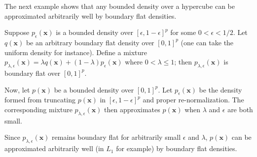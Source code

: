 The next example shows that any bounded density over a hypercube can
be approximated arbitrarily well by boundary flat densities.

\begin{example}
\label{ex:mixture_approx}
Suppose $p_\epsilon(\mathbf{x})$ is a bounded density over $[\epsilon,
  1-\epsilon]^p$ for some $0 < \epsilon < 1/2$. Let $q(\mathbf{x})$ be
an arbitrary boundary flat density over $[0,1]^p$ (one can take the
uniform density for instance). Define a mixture $p_{\lambda,
  \epsilon}(\mathbf{x}) = \lambda q(\mathbf{x}) + (1-\lambda)
p_\epsilon(\mathbf{x})$ where $0 < \lambda \leq 1$; then $p_{\lambda,
  \epsilon}(\mathbf{x})$ is boundary flat over $[0,1]^p$.

Now, let $p(\mathbf{x})$ be a bounded density over $[0,1]^p$. Let
$p_\epsilon(\mathbf{x})$ be the density formed from truncating
$p(\mathbf{x})$ in $[\epsilon, 1-\epsilon]^p$ and proper re-normalization. The corresponding
mixture $p_{\lambda,\epsilon}(\mathbf{x})$ then approximates
$p(\mathbf{x})$ when $\lambda$ and $\epsilon$ are both small.

Since $p_{\lambda,\epsilon}(\mathbf{x})$ remains boundary flat for
arbitrarily small $\epsilon$ and $\lambda$, $p(\mathbf{x})$ can be
approximated arbitrarily well (in $L_1$ for example) by boundary flat
densities.
\end{example}






